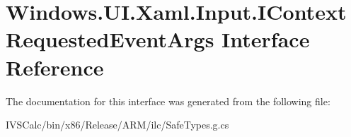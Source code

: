 \hypertarget{interface_windows_1_1_u_i_1_1_xaml_1_1_input_1_1_i_context_requested_event_args}{}\section{Windows.\+U\+I.\+Xaml.\+Input.\+I\+Context\+Requested\+Event\+Args Interface Reference}
\label{interface_windows_1_1_u_i_1_1_xaml_1_1_input_1_1_i_context_requested_event_args}


The documentation for this interface was generated from the following file\+:\begin{DoxyCompactItemize}
\item 
I\+V\+S\+Calc/bin/x86/\+Release/\+A\+R\+M/ilc/Safe\+Types.\+g.\+cs\end{DoxyCompactItemize}
